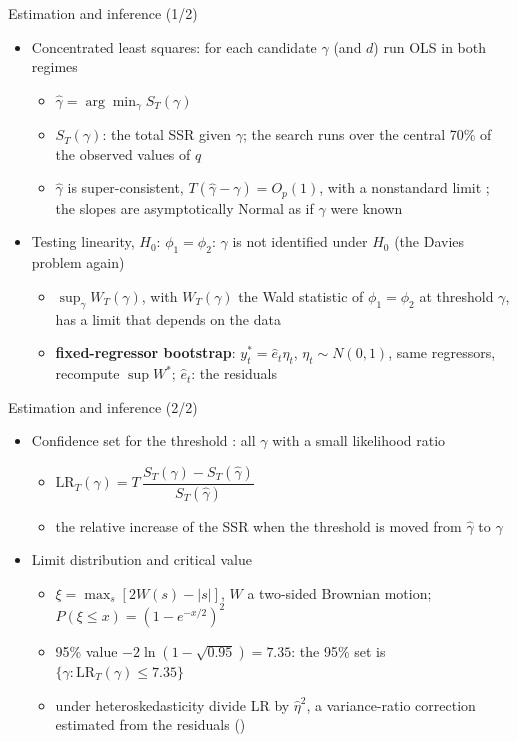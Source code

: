 \begin{frame}{Estimation and inference (1/2)}
\itemsize{\small}
\begin{itemize}
    \item Concentrated least squares: for each candidate $\gamma$ (and $d$) run OLS in both regimes
    \begin{itemize}
        \item $\hat\gamma = \arg\min_\gamma S_T(\gamma)$
        \item $S_T(\gamma)$: the total SSR given $\gamma$; the search runs over the central 70\% of the observed values of $q$
        \item $\hat\gamma$ is super-consistent, $T(\hat\gamma - \gamma) = O_p(1)$, with a nonstandard limit ; the slopes are asymptotically Normal as if $\gamma$ were known
    \end{itemize}
    \item Testing linearity, $H_0$: $\phi_1 = \phi_2$: $\gamma$ is not identified under $H_0$ (the Davies problem again) 
    \begin{itemize}
        \item $\sup_\gamma W_T(\gamma)$, with $W_T(\gamma)$ the Wald statistic of $\phi_1 = \phi_2$ at threshold $\gamma$, has a limit that depends on the data
        \item \textbf{fixed-regressor bootstrap}: $y_t^* = \hat e_t\eta_t$, $\eta_t \sim N(0, 1)$, same regressors, recompute $\sup W^*$; $\hat e_t$: the residuals
    \end{itemize}
\end{itemize}
\end{frame}

\begin{frame}{Estimation and inference (2/2)}
\itemsize{\small}
\begin{itemize}
    \item Confidence set for the threshold : all $\gamma$ with a small likelihood ratio
    \begin{itemize}
        \item $\mathrm{LR}_T(\gamma) = T\,\dfrac{S_T(\gamma) - S_T(\hat\gamma)}{S_T(\hat\gamma)}$
        \item the relative increase of the SSR when the threshold is moved from $\hat\gamma$ to $\gamma$
    \end{itemize}
    \item Limit distribution and critical value
    \begin{itemize}
        \item $\xi = \max_s[2W(s) - |s|]$, $W$ a two-sided Brownian motion; $P(\xi \le x) = (1 - e^{-x/2})^2$
        \item 95\% value $-2\ln(1 - \sqrt{0.95}) = 7.35$: the 95\% set is $\{\gamma: \mathrm{LR}_T(\gamma) \le 7.35\}$
        \item under heteroskedasticity divide LR by $\hat\eta^2$, a variance-ratio correction estimated from the residuals ()
    \end{itemize}
\end{itemize}
\end{frame}

